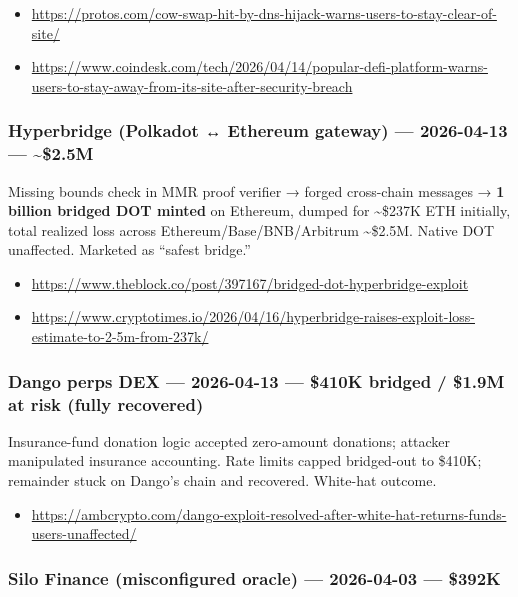 \begin{itemize}
\tightlist
\item
  \url{https://protos.com/cow-swap-hit-by-dns-hijack-warns-users-to-stay-clear-of-site/}
\item
  \url{https://www.coindesk.com/tech/2026/04/14/popular-defi-platform-warns-users-to-stay-away-from-its-site-after-security-breach}
\end{itemize}

\subsubsection{Hyperbridge (Polkadot ↔ Ethereum gateway) --- 2026-04-13 --- \textasciitilde\$2.5M}\label{hyperbridge-polkadot-ethereum-gateway-2026-04-13-2.5m}

Missing bounds check in MMR proof verifier → forged cross-chain messages → \textbf{1 billion bridged DOT minted} on Ethereum, dumped for \textasciitilde\$237K ETH initially, total realized loss across Ethereum/Base/BNB/Arbitrum \textasciitilde\$2.5M. Native DOT unaffected. Marketed as ``safest bridge.''

\begin{itemize}
\tightlist
\item
  \url{https://www.theblock.co/post/397167/bridged-dot-hyperbridge-exploit}
\item
  \url{https://www.cryptotimes.io/2026/04/16/hyperbridge-raises-exploit-loss-estimate-to-2-5m-from-237k/}
\end{itemize}

\subsubsection{Dango perps DEX --- 2026-04-13 --- \$410K bridged / \$1.9M at risk (fully recovered)}\label{dango-perps-dex-2026-04-13-410k-bridged-1.9m-at-risk-fully-recovered}

Insurance-fund donation logic accepted zero-amount donations; attacker manipulated insurance accounting. Rate limits capped bridged-out to \$410K; remainder stuck on Dango's chain and recovered. White-hat outcome.

\begin{itemize}
\tightlist
\item
  \url{https://ambcrypto.com/dango-exploit-resolved-after-white-hat-returns-funds-users-unaffected/}
\end{itemize}

\subsubsection{Silo Finance (misconfigured oracle) --- 2026-04-03 --- \$392K}\label{silo-finance-misconfigured-oracle-2026-04-03-392k}


